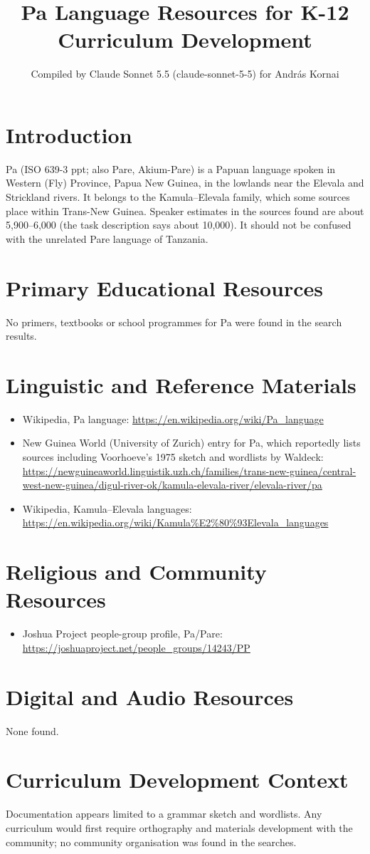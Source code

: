 \documentclass[12pt]{article}
\title{Pa Language Resources for K-12 Curriculum Development}
\author{Compiled by Claude Sonnet 5.5 (claude-sonnet-5-5) for Andr\'as Kornai}
\date{}
\begin{document}
\maketitle
\section{Introduction}
Pa (ISO 639-3 ppt; also Pare, Akium-Pare) is a Papuan language spoken in Western (Fly) Province, Papua New Guinea, in the lowlands near the Elevala and Strickland rivers. It belongs to the Kamula--Elevala family, which some sources place within Trans-New Guinea. Speaker estimates in the sources found are about 5,900--6,000 (the task description says about 10,000). It should not be confused with the unrelated Pare language of Tanzania.
\section{Primary Educational Resources}
No primers, textbooks or school programmes for Pa were found in the search results.
\section{Linguistic and Reference Materials}
\begin{itemize}
\item Wikipedia, Pa language: \url{https://en.wikipedia.org/wiki/Pa_language}
\item New Guinea World (University of Zurich) entry for Pa, which reportedly lists sources including Voorhoeve's 1975 sketch and wordlists by Waldeck: \url{https://newguineaworld.linguistik.uzh.ch/families/trans-new-guinea/central-west-new-guinea/digul-river-ok/kamula-elevala-river/elevala-river/pa}
\item Wikipedia, Kamula--Elevala languages: \url{https://en.wikipedia.org/wiki/Kamula%E2%80%93Elevala_languages}
\end{itemize}
\section{Religious and Community Resources}
\begin{itemize}
\item Joshua Project people-group profile, Pa/Pare: \url{https://joshuaproject.net/people_groups/14243/PP}
\end{itemize}
\section{Digital and Audio Resources}
None found.
\section{Curriculum Development Context}
Documentation appears limited to a grammar sketch and wordlists. Any curriculum would first require orthography and materials development with the community; no community organisation was found in the searches.
\end{document}
